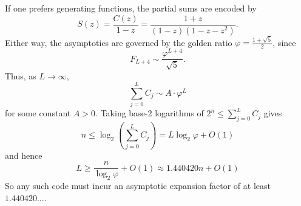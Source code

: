 If one prefers generating functions, the partial sums are encoded by
\begin{equation*}
    S(z) = \frac{C(z)}{1 - z} = \frac{1 + z}{(1 - z)(1 - z - z^{2})}.
\end{equation*}
Either way, the asymptotics are governed by the golden ratio $\varphi = \frac{1+\sqrt{5}}{2}$, since
\begin{equation*}
    F_{L + 4} \sim \frac{\varphi^{L + 4}}{\sqrt{5}}.
\end{equation*}
Thus, as $L \to \infty$,
\begin{equation*}
    \sum_{j = 0}^{L} C_{j} \sim A \cdot \varphi^{L}
\end{equation*}
for some constant $A > 0$. Taking base-2 logarithms of $2^{n} \leq \sum_{j = 0}^{L} C_{j}$ gives
\begin{equation*}
    n \leq \log_{2}\left(\sum_{j = 0}^{L} C_{j}\right) = L \log_{2}\varphi + O(1)
\end{equation*}
and hence
\begin{equation*}
    L \geq \frac{n}{\log_{2}\varphi} + O(1) \approx 1.440420n + O(1)
\end{equation*}
So any such code must incur an asymptotic expansion factor of at least $1.440420\ldots$.


